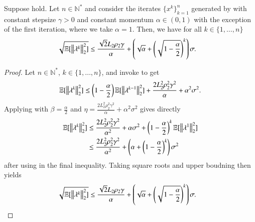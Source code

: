 \begin{toappendix}
\begin{lemma}
    Suppose  hold. Let $n \in \mathbb{N}^*$ and consider the iterates $\{x^k\}_{k=1}^n$ generated by  with constant stepsize $\gamma >0$ and constant momentum $\alpha\in(0,1)$ with the exception of the first iteration, where we take $\alpha=1$.
    Then, we have for all $k\in\{1,\ldots,n\}$
    \begin{equation*}
        \begin{aligned}
            \sqrt{\mathbb{E}[\left\Vert{\lambda^k}\right\Vert_2^2]}
                &\leq \frac{\sqrt{2}L_2\rho_2\gamma}{\alpha} + \left(\sqrt{\alpha} + \left(\sqrt{1-\frac{\alpha}{2}}\right)^k\right)\sigma.
        \end{aligned}
    \end{equation*}
\end{lemma}
\begin{proof}
    Let $n\in\mathbb{N}^*$, $k\in\{1,\ldots,n\}$, and invoke  to get
    \begin{equation*}
        \mathbb{E}[\left\Vert{\lambda^k}\right\Vert_2^2] \leq \left(1-\frac{\alpha}{2}\right)\mathbb{E}[\left\Vert{\lambda^{k-1}}\right\Vert_2^2] + \frac{2L_2^2\rho_2^2\gamma^2}{\alpha} + \alpha^2\sigma^2.
    \end{equation*}
    Applying  with $\beta = \frac{\alpha}{2}$ and $\eta = \frac{2L_2^2\rho_2^2\gamma^2}{\alpha}+\alpha^2\sigma^2$ gives directly
    \begin{equation*}
        \begin{aligned}
            \mathbb{E}[\left\Vert{\lambda^k}\right\Vert_2^2]
                &\leq \frac{2L_2^2\rho_2^2\gamma^2}{\alpha^2} + \alpha\sigma^2 + \left(1-\frac{\alpha}{2}\right)^k\mathbb{E}[\left\Vert{\lambda^1}\right\Vert_2^2]\\
                &\leq \frac{2L_2^2\rho_2^2\gamma^2}{\alpha^2} + \left(\alpha + \left(1-\frac{\alpha}{2}\right)^k\right)\sigma^2
        \end{aligned}
    \end{equation*}
    after using  in the final inequality.
    Taking square roots and upper boudning then yields
    \begin{equation*}
        \begin{aligned}
            \sqrt{\mathbb{E}[\left\Vert{\lambda^k}\right\Vert_2^2]}
                &\leq \frac{\sqrt{2}L_2\rho_2\gamma}{\alpha} + \left(\sqrt{\alpha} + \left(\sqrt{1-\frac{\alpha}{2}}\right)^k\right)\sigma.
        \end{aligned}
    \end{equation*}
\end{proof}

\end{toappendix}

